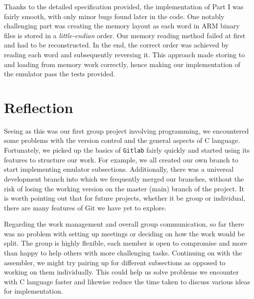 \documentclass[12pt, letterpaper]{article}
\begin{document}
Thanks to the detailed specification provided, the implementation of Part I was fairly smooth, with only minor bugs found later in the code. One notably challenging part was creating the memory layout as each word in ARM binary files is stored in a \textit{little-endian} order. Our memory reading method failed at first and had to be reconstructed. In the end, the correct order was achieved by reading each word and subsequently reversing it. This approach made storing to and loading from memory work correctly, hence making our implementation of the emulator pass the tests provided.

\section{Reflection}
Seeing as this was our first group project involving programming, we encountered some problems with the version control and the general aspects of C language. Fortunately, we picked up the basics of \verb|Gitlab| fairly quickly and started using its features to structure our work. For example, we all created our own branch to start implementing emulator subsections. Additionally, there was a universal development branch into which we frequently merged our branches, without the risk of losing the working version on the master (main) branch of the project. It is worth pointing out that for future projects, whether it be group or individual, there are many features of Git we have yet to explore. 

Regarding the work management and overall group communication, so far there was no problem with setting up meetings or deciding on how the work would be split. The group is highly flexible, each member is open to compromise and more than happy to help others with more challenging tasks. Continuing on with the assembler, we might try pairing up for different subsections as opposed to working on them individually. This could help us solve problems we encounter with C language faster and likewise reduce the time taken to discuss various ideas for implementation.
\end{document}
